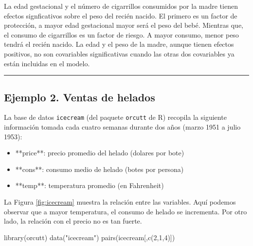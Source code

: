 \documentclass[
]{article}
\newenvironment{Shaded}{\begin{snugshade}}{\end{snugshade}}
\newcommand{\DecValTok}[1]{\textcolor[rgb]{0.00,0.00,0.81}{#1}}
\newcommand{\FunctionTok}[1]{\textcolor[rgb]{0.00,0.00,0.00}{#1}}
\newcommand{\NormalTok}[1]{#1}
\newcommand{\StringTok}[1]{\textcolor[rgb]{0.31,0.60,0.02}{#1}}
\begin{document}
La edad gestacional y el número de cigarrillos consumidos por la madre tienen efectos signficativos sobre el peso del recién nacido. El primero es un factor de protección, a mayor edad gestacional mayor será el peso del bebé. Mientras que, el consumo de cigarrillos es un factor de riesgo. A mayor consumo, menor peso tendrá el recién nacido. La edad y el peso de la madre, aunque tienen efectos positivos, no son covariables significativas cuando las otras dos covariables ya están incluidas en el modelo.

\rule{\textwidth}{0.4pt}

\hypertarget{ejemplo-2.-ventas-de-helados}{%
\subsection*{Ejemplo 2. Ventas de helados}\label{ejemplo-2.-ventas-de-helados}}

La base de datos \texttt{icecream} (del paquete \texttt{orcutt} de R) recopila la siguiente información tomada cada cuatro semanas durante dos años (marzo 1951 a julio 1953):

\begin{itemize}
\item **price**: precio promedio del helado (dolares por bote)
\item **cons**: consumo medio de helado (botes por persona)
\item **temp**: temperatura promedio (en Fahrenheit)
\end{itemize}

La Figura \ref{fig:icecream} muestra la relación entre las variables. Aquí podemos observar que a mayor temperatura, el consumo de helado se incrementa. Por otro lado, la relación con el precio no es tan fuerte.

\begin{Shaded}
\begin{Highlighting}[]
\FunctionTok{library}\NormalTok{(orcutt)}
\FunctionTok{data}\NormalTok{(}\StringTok{"icecream"}\NormalTok{)}
\FunctionTok{pairs}\NormalTok{(icecream[,}\FunctionTok{c}\NormalTok{(}\DecValTok{2}\NormalTok{,}\DecValTok{1}\NormalTok{,}\DecValTok{4}\NormalTok{)])}
\end{Highlighting}
\end{Shaded}
\end{document}

